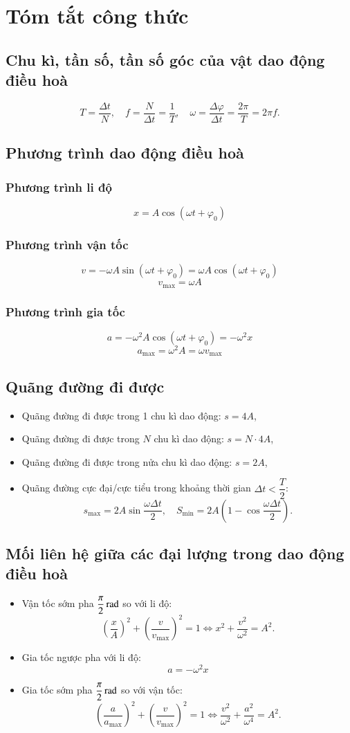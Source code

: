 \chapter{Tóm tắt công thức}
\section{Chu kì, tần số, tần số góc của vật dao động điều hoà}
$$T=\dfrac{\Delta t}{N},\quad f=\dfrac{N}{\Delta t}=\dfrac{1}{T}, \quad \omega=\dfrac{\Delta \varphi}{\Delta t}=\dfrac{2\pi}{T}=2\pi f.$$
\section{Phương trình dao động điều hoà}
\subsection{Phương trình li độ}
$$x=A\cos\left(\omega t+\varphi_0\right)$$
\subsection{Phương trình vận tốc}
$$v=-\omega A\sin\left(\omega t+\varphi_0\right)=\omega A\cos\left(\omega t+\varphi_0\right)$$
$$v_\text{max}=\omega A$$
\subsection{Phương trình gia tốc}
$$a=-\omega^2A\cos\left(\omega t+\varphi_0\right)=-\omega^2x$$
$$a_\text{max}=\omega^2A=\omega v_\text{max}$$
\section{Quãng đường đi được}
\begin{itemize}
	\item Quãng đường đi được trong 1 chu kì dao động: $s=4A$,
	\item Quãng đường đi được trong $N$ chu kì dao động: $s=N\cdot4A$,
	\item Quãng đường đi được trong nửa chu kì dao động: $s=2A$,
	\item Quãng đường cực đại/cực tiểu trong khoảng thời gian $\Delta t<\dfrac{T}{2}$:
	$$s_\text{max}=2A\sin\dfrac{\omega \Delta t}{2}, \quad S_\text{min}=2A\left(1-\cos\dfrac{\omega \Delta t}{2}\right).$$
\end{itemize}
\section{Mối liên hệ giữa các đại lượng trong dao động điều hoà}
\begin{itemize}
	\item Vận tốc sớm pha $\xsi{\dfrac{\pi}{2}}{\radian}$ so với li độ:
	$$\left(\dfrac{x}{A}\right)^2+\left(\dfrac{v}{v_\text{max}}\right)^2=1\Leftrightarrow x^2+\dfrac{v^2}{\omega^2}=A^2.$$
	\item Gia tốc ngược pha với li độ:
	$$a=-\omega^2x$$
	\item Gia tốc sớm pha $\xsi{\dfrac{\pi}{2}}{\radian}$ so với vận tốc: 
	$$\left(\dfrac{a}{a_\text{max}}\right)^2+\left(\dfrac{v}{v_\text{max}}\right)^2=1\Leftrightarrow \dfrac{v^2}{\omega^2}+\dfrac{a^2}{\omega^4}=A^2.$$
\end{itemize}
